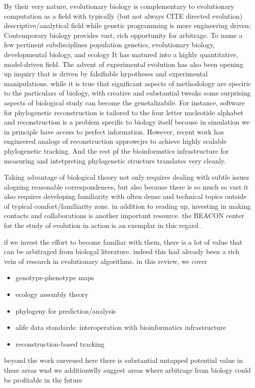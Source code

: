 By their very nature, evolutionary biology is complementary to evolutionary computation as a field with typically (but not always CITE directed evolution) descriptive/analytical field while genetic programming is more engineering driven;
Contemporary biology provides vast, rich opportunity for arbitrage.
To name a few pertinent subdisciplines population genetics, evolutionary biology, developmental biology, and ecology
It has matured into a highly quantitative, model-driven field.
The advent of experimental evolution has also been opening up inquiry that is driven by falsifiable hypotheses and experimental manipulations.
while it is true that significant aspects of methodology are speciric to the particulars of biology, with creative and substantial tweaks some surprising aspects of biological study can become the genetalizabile.
For instance, software for phylogenetic reconstruction is tailored to the four letter nucleotide alphabet and reconstruction is a problem specific to biology itself because in simulation we in principle have access to perfect information.
However, recent work has engineered analogs of reconstruction approwcjrs to achieve highly scalable phylogenetic tracking.
And the rest pf the bioinformstics infrastructure for measuring and intetpreting phylogenetic structure translates very cleanly.

Taking advantage of biological theory not only requires dealing with subtle issues alogning reasonable correspondences, but also because there is so much so vast it also requires developing familiarity with often dense and technical topics outside of typical comfort/familiarity zone.
in addition to reading up, investing in making contacts and collaborations is another important resource.
the BEACON center for the study of evolution in action is an exemplar in this regard \citep{goodman2020evolution}.

if we invest the effort to become familiar with them, there is a lot of value that can be arbitraged from biologal literature.
indeed this had already been a rich vein of research in evolutionary algorithms.
in this review, we cover
\begin{itemize}
  \item genotype-phenotype maps
  \item ecology assembly theory \citep{dolson2024reachability}
  \item phylogeny for prediction/analysis \citep{hernandez2022can,shahbandegan2022untangling}
  \item alife data standards: interoperation with bioinformatics infrastructure \citep{lalejini2019data,moreno2024apc}
  \item reconstruction-based tracking \citep{moreno2022hstrat,moreno2024ecology}
\end{itemize}
beyond the work surveued here there is substantial untapped potential value in these areas wnd we additionwlly suggest areas where arbitrage from biology could be profitable in the future

